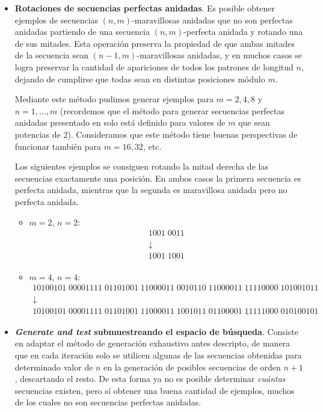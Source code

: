 \begin{itemize}
	\item \textbf{Rotaciones de secuencias perfectas anidadas}. Es posible obtener ejemplos
	de secuencias $(n,m)$-maravillosas anidadas que no son perfectas anidadas
	partiendo de una secuencia $(n,m)$-perfecta anidada y rotando una de sus
	mitades. Esta operación preserva la propiedad de que ambas mitades de la
	secuencia sean $(n-1,m)$-maravillosas anidadas, y en muchos casos se logra
	preservar la cantidad de apariciones de todos los patrones de longitud $n$,
	dejando de cumplirse que todas sean en distintas posiciones módulo $m$.

	Mediante este método pudimos generar ejemplos para $m = 2, 4, 8$ y
	$n = 1, \dots, m$ (recordemos que el método para generar secuencias perfectas
	anidadas presentado en \cite{becher-nested-perfect} solo está definido para valores
	de $m$ que sean potencias de $2$). Consideramos que este método tiene buenas
	perspectivas de funcionar también para $m = 16, 32$, etc.

	Los siguientes ejemplos se consiguen rotando la mitad derecha
	de las secuencias exactamente una posición. En ambos casos la primera
	secuencia es perfecta anidada, mientras que la segunda es maravillosa anidada
	pero no perfecta anidada.

	\begin{itemize}
		\item $m = 2$, $n = 2$:
		\[
			\begin{array}{c}
				1001\; \underline{0011} \\
				\downarrow \\
				1001\; \underline{1001}
			\end{array}
		\]
		\item $m = 4$, $n = 4$:
		\[
			\begin{array}{c}
				10100101\;00001111\;01101001\;11000011\;\underline{0010110\;11000011\;11110000\;101001011} \\
				\downarrow \\
				10100101\;00001111\;01101001\;11000011\;\underline{1001011\;01100001\;11111000\;010100101}
			\end{array}
		\]
	\end{itemize}

	\item \textbf{\emph{Generate and test} submuestreando el espacio de búsqueda}.
	Consiste en adaptar el método de generación exhaustivo antes descripto, de
	manera que en cada iteración solo se utilicen algunas de las secuencias
	obtenidas para determinado valor de $n$ en la generación de posibles
	secuencias de orden $n + 1$, descartando el resto. De esta forma ya no es
	posible determinar \emph{cuántas} secuencias existen, pero sí obtener una
	buena cantidad de ejemplos, muchos de los cuales no son secuencias perfectas
	anidadas.


\end{itemize}
